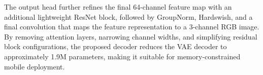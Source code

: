 The output head further refines the final 64-channel feature map with an additional lightweight ResNet block, followed by GroupNorm, Hardswish, and a final convolution that maps the feature representation to a 3-channel RGB image. By removing attention layers, narrowing channel widths, and simplifying residual block configurations, the proposed decoder reduces the VAE decoder to approximately 1.9M parameters, making it suitable for memory-constrained mobile deployment.

